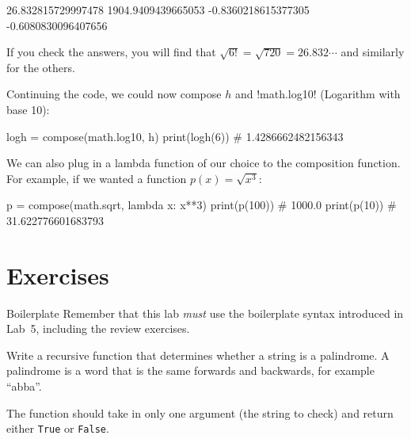\documentclass[11pt]{cselabheader}
\begin{document}
\begin{verbatimcode}
26.832815729997478
1904.9409439665053
-0.8360218615377305
-0.6080830096407656
\end{verbatimcode}

If you check the answers, you will find that $\sqrt{ 6! } = \sqrt{ 720 } =
26.832\cdots$ and similarly for the others.

Continuing the code, we could now compose $h$ and \pythoninline!math.log10!
(Logarithm with base 10):
\begin{python3code}
logh = compose(math.log10, h)
print(logh(6)) # 1.4286662482156343
\end{python3code}

We can also plug in a lambda function of our choice to the composition function.
For example, if we wanted a function $p(x) = \sqrt{ x^3 }$:
\begin{python3code}
p = compose(math.sqrt, lambda x: x**3)
print(p(100)) # 1000.0
print(p(10)) # 31.622776601683793
\end{python3code}

\pagebreak

\section{Exercises}
\label{sec:ex}

\begin{warningbox}{Boilerplate}
  Remember that this lab \emph{must} use the
  boilerplate syntax introduced in Lab~5, including the review exercises.
\end{warningbox}

\begin{ex}[palindrome.py] Write a recursive function that determines whether a
    string is a palindrome. A palindrome is a word that is the same forwards and
    backwards, for example ``abba''.

    The function should take in only one argument (the string to check) and
    return either \lstinline{True} or \lstinline{False}.
\end{ex}
\end{document}
